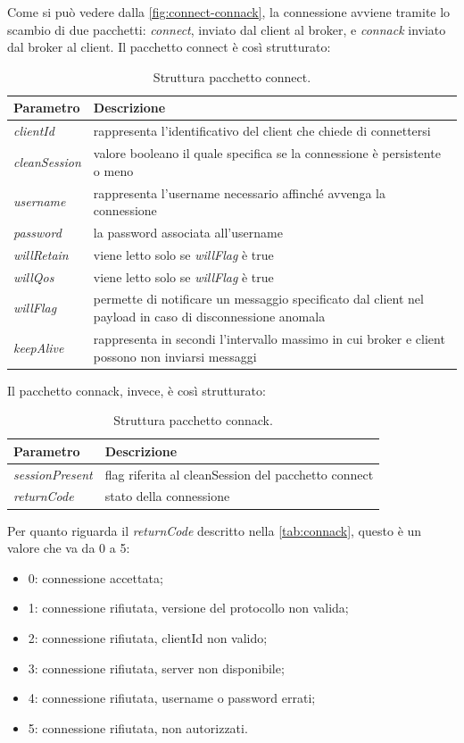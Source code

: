 \documentclass[binding=0.6cm,TFA]{sapthesis}
\begin{document}
\begin{large}
Come si può vedere dalla \autoref{fig:connect-connack}, la connessione avviene tramite lo scambio di due pacchetti: \textit{connect}, inviato dal client al broker, e \textit{connack} inviato dal broker al client. Il pacchetto connect è così strutturato:
\begin{table}[h]
\caption{Struttura pacchetto connect.}
\label{tab:connect}
\begin{tabular}{lp{}}
\toprule
\textbf{Parametro} & \textbf{Descrizione} \\
\midrule
\textit{clientId} & rappresenta l'identificativo del client che chiede di connettersi \\
\textit{cleanSession} & valore booleano il quale specifica se la connessione è persistente o meno \\
\textit{username} & rappresenta l'username necessario affinché avvenga la connessione \\
\textit{password} & la password associata all'username \\
\textit{willRetain} & viene letto solo se \textit{willFlag} è true \\
\textit{willQos} & viene letto solo se \textit{willFlag} è true \\
\textit{willFlag} & permette di notificare un messaggio specificato dal client nel payload in caso di disconnessione anomala \\
\textit{keepAlive} & rappresenta in secondi l'intervallo massimo in cui broker e client possono non inviarsi messaggi \\
\bottomrule
\end{tabular}
\end{table}

Il pacchetto connack, invece, è così strutturato: \\
\begin{table}[h]
\caption{Struttura pacchetto connack.}
\label{tab:connack}
\begin{tabular}{lp{}}
\toprule
\textbf{Parametro} & \textbf{Descrizione} \\
\midrule
\textit{sessionPresent} & flag riferita al cleanSession del pacchetto connect \\
\textit{returnCode} & stato della connessione \\
\bottomrule
\end{tabular}
\end{table}

Per quanto riguarda il \textit{returnCode} descritto nella \autoref{tab:connack}, questo è un valore che va da 0 a 5:
\begin{itemize}
\item 0: connessione accettata;
\item 1: connessione rifiutata, versione del protocollo non valida;
\item 2: connessione rifiutata, clientId non valido;
\item 3: connessione rifiutata, server non disponibile;
\item 4: connessione rifiutata, username o password errati;
\item 5: connessione rifiutata, non autorizzati.
\end{itemize}


\end{large}
\end{document}
